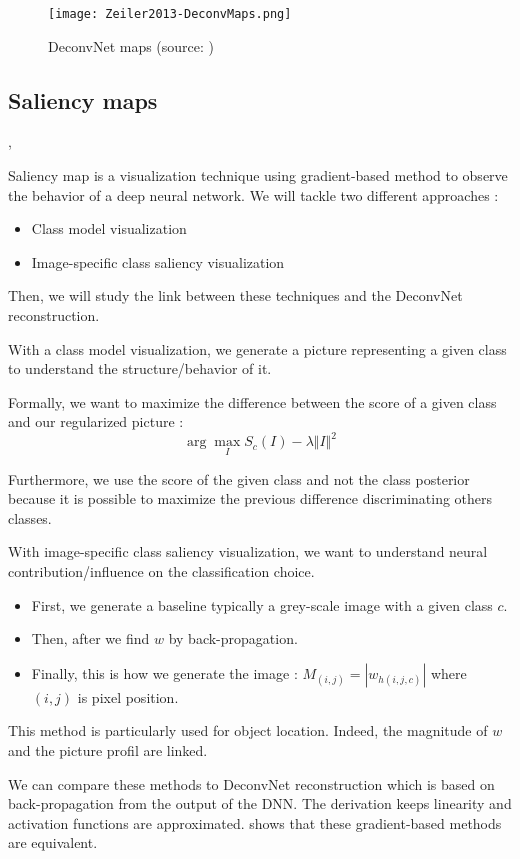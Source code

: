 \begin{figure}[H]
    \texttt{[image: Zeiler2013-DeconvMaps.png]}
    \caption{DeconvNet maps (source: \cite{Zeiler2013})}
    \label{fig:deconvnetmaps}
\end{figure}

\subsection{Saliency maps}
\cite{Erhan2009}, \cite{Simonyan2014}

Saliency map is a visualization technique using gradient-based method to observe the behavior of a deep neural network. We will tackle two different approaches :
\begin{itemize}
    \item Class model visualization
    \item Image-specific class saliency visualization
\end{itemize}  
Then, we will study the link between these techniques and the DeconvNet reconstruction.

With a class model visualization, we generate a picture representing a given class to understand the structure/behavior of it.

Formally, we want to maximize the difference between the score of a given class and our regularized picture : 
\[\arg \underset{I}{\max} {S_c(I)-\lambda{\Vert I \Vert^2}}\]

Furthermore, we use the score of the given class and not the class posterior because it is possible to maximize the previous difference discriminating others classes.

With image-specific class saliency visualization, we want to understand neural contribution/influence on the classification choice.
\begin{itemize}
    \item First, we generate a baseline typically a grey-scale image with a given class \(c\).
    \item Then, after  we find \(w\) by back-propagation.   
    \item Finally, this is how we generate the image : \(M_{(i,j)} = |w_{h(i,j,c)}|\) where \((i,j)\) is pixel position.
\end{itemize}

This method is particularly used for object location. Indeed, the magnitude of \(w\) and the picture profil are linked.

We can compare these methods to DeconvNet reconstruction which is based on back-propagation from the output of the DNN. The derivation keeps linearity and activation functions are approximated. \cite{Simonyan2014} shows that these gradient-based methods are equivalent.


